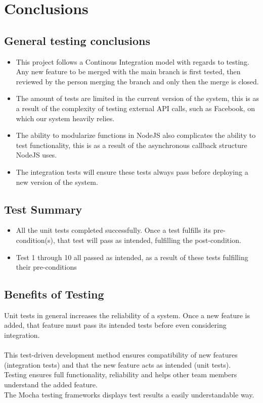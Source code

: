 \documentclass{article}
\begin{document}
\pagebreak
\section{Conclusions}
\subsection{General testing conclusions}
\begin{itemize}
\item This project follows a Continous Integration model with regards to testing. Any new feature to be merged with the main branch is first tested, then reviewed by the person merging the branch and only then the merge is closed.

\item  The amount of tests are limited in the current version of the system, this is as a result of the complexity of testing external API calls, such as Facebook, on which our system heavily relies.


\item The ability to modularize functions in NodeJS also complicates the ability to test functionality, this is as a result of the asynchronous callback structure NodeJS uses. 
\item The integration tests will ensure these tests always pass before deploying a new version of the system.
\end{itemize}

\subsection{Test Summary}
\begin{itemize} 
\item All the unit tests completed successfully. Once a test fulfills its pre-condition(s), that test will pass as intended, fulfilling the post-condition. 
\item Test 1 through 10 all passed as intended, as a result of these tests fulfilling their pre-conditions
\end{itemize}
\subsection{Benefits of Testing}
Unit tests in general increases the reliability of a system. Once a new feature is added, that feature must pass its intended tests before even considering integration.\\ \\ This test-driven development method ensures compatibility of new features (integration tests) and that the new feature acts as intended (unit tests). \\
Testing ensures full functionality, reliability and helps other team members understand the added feature. \\ 
The Mocha testing frameworks displays test results a easily understandable way.
\end{document}
